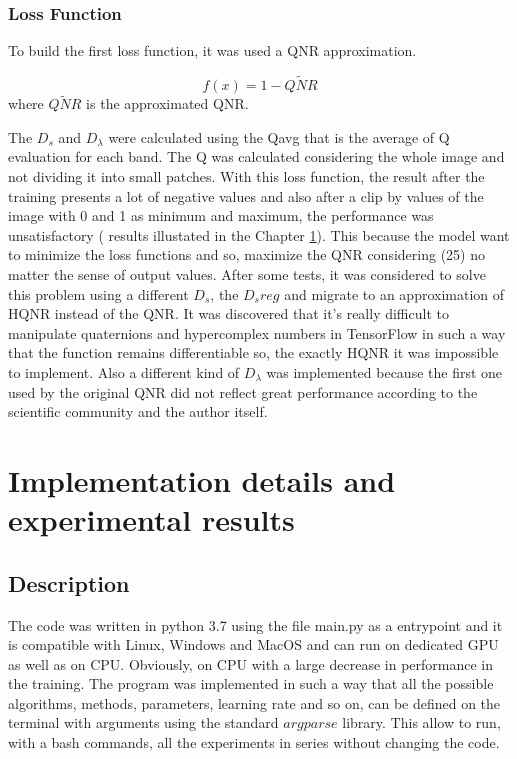 \documentclass[12pt]{report}
\begin{document}
\subsection{Loss Function}

To build the first loss function, it was used a QNR approximation. 

\begin{equation}
    f(x) = 1 - \widetilde{QNR}
    \label{loss}
\end{equation}
%
where $\widetilde{QNR}$ is the approximated QNR.

The $D_s$ and $D_\lambda$ were calculated using the Qavg that is the average of Q evaluation for each band. The Q was calculated considering the whole image and not
dividing it into small patches.
With this loss function, the result after the training presents a lot of negative values and also after a clip
by values of the image with 0 and 1 as minimum and maximum, the performance was unsatisfactory ( results illustated in the Chapter \ref{chap4}).
This because the model want to minimize the loss functions and so, maximize the QNR considering (25) no matter 
the sense of output values.
After some tests, it was considered to solve this problem using a different $D_s$, the $D_sreg$ \cite{dsreg} 
and migrate to an approximation of HQNR instead of the QNR.
It was discovered that it's really difficult to manipulate quaternions and hypercomplex numbers in TensorFlow in such
a way that the function remains differentiable so, the exactly HQNR it was impossible to implement.  
Also a different kind of $D_\lambda$ was implemented because the first one used by the original 
QNR did not reflect great performance according to the scientific community and the author itself.

\chapter{Implementation details and experimental results}\label{chap4}
\section{Description}
The code was written in python 3.7 using the file main.py as a entrypoint and it is compatible with Linux, Windows and MacOS and can run on dedicated GPU as well as on CPU.
Obviously, on CPU with a large decrease in performance in the training.
The program was implemented in such a way that all the possible algorithms, methods, parameters, learning rate and so on,
can be defined on the terminal with arguments using the standard $argparse$ library.
This allow to run, with a bash commands, all the experiments in series without changing the code.
\end{document}
